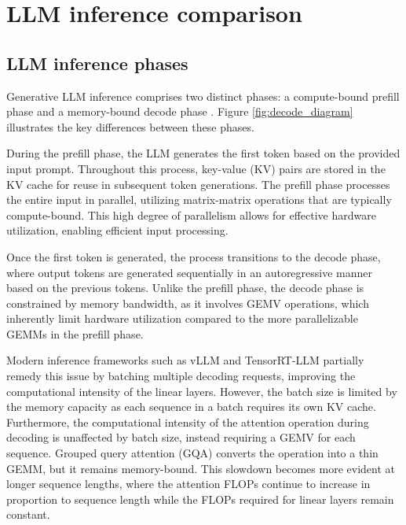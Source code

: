 \section{LLM inference comparison}\label{sec:g2_vs_h100}

\subsection{LLM inference phases}

Generative LLM inference comprises two distinct phases: a compute-bound prefill phase and a memory-bound decode phase \citep{splitwise, distserve_ZhongLCHZL0024}. Figure  \ref{fig:decode_diagram} illustrates the key differences between these phases.

During the prefill phase, the LLM generates the first token based on the provided input prompt. 
Throughout this process, key-value (KV) pairs are stored in the KV cache for reuse in subsequent token generations.
The prefill phase processes the entire input in parallel, utilizing matrix-matrix operations that are typically compute-bound. This high degree of parallelism allows for effective hardware utilization, enabling efficient input processing.

Once the first token is generated, the process transitions to the decode phase, where output tokens are generated sequentially in an autoregressive manner based on the previous tokens. 
Unlike the prefill phase, the decode phase is constrained by memory bandwidth, as it involves GEMV operations, which inherently limit hardware utilization compared to the more parallelizable GEMMs in the prefill phase.

Modern inference frameworks such as vLLM \citep{kwon2023efficient} and TensorRT-LLM \citep{TensorRT_LLM} partially remedy this issue by batching multiple decoding requests, improving the computational intensity of the linear layers. However, the batch size is limited by the memory capacity as each sequence in a batch requires its own KV cache. Furthermore, the computational intensity of the attention operation during decoding is unaffected by batch size, instead requiring a GEMV for each sequence. Grouped query attention (GQA) \citep{ainslie2023gqa} converts the operation into a thin GEMM, but it remains memory-bound. This slowdown becomes more evident at longer sequence lengths, where the attention FLOPs continue to increase in proportion to sequence length while the FLOPs required for linear layers remain constant.

